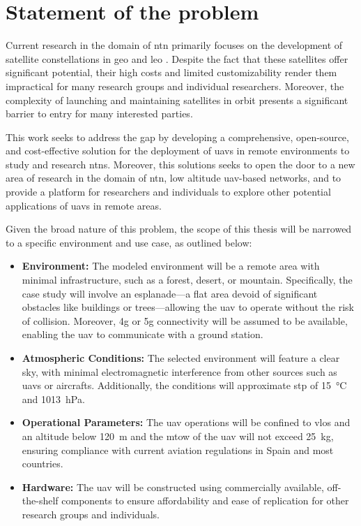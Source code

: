 
\chapter{Statement of the problem}\label{ch:statement_of_problem}

Current research in the domain of \gls{ntn} primarily focuses on the development of satellite constellations in \gls{geo} and \gls{leo} \autocite{non_terrestial_networks_trends}. Despite the fact that these satellites offer significant potential, their high costs and limited customizability render them impractical for many research groups and individual researchers. Moreover, the complexity of launching and maintaining satellites in orbit presents a significant barrier to entry for many interested parties.

This work seeks to address the gap by developing a comprehensive, open-source, and cost-effective solution for the deployment of \glspl{uav} in remote environments to study and research \glspl{ntn}. Moreover, this solutions seeks to open the door to a new area of research in the domain of \gls{ntn}, low altitude \gls{uav}-based networks, and to provide a platform for researchers and individuals to explore other potential applications of \glspl{uav} in remote areas.

Given the broad nature of this problem, the scope of this thesis will be narrowed to a specific environment and use case, as outlined below:

\begin{itemize}
  \item \textbf{Environment:} The modeled environment will be a remote area with minimal infrastructure, such as a forest, desert, or mountain. Specifically, the case study will involve an esplanade—a flat area devoid of significant obstacles like buildings or trees—allowing the \gls{uav} to operate without the risk of collision. Moreover, \gls{4g} or \gls{5g} connectivity will be assumed to be available, enabling the \gls{uav} to communicate with a ground station.

  \item \textbf{Atmospheric Conditions:} The selected environment will feature a clear sky, with minimal electromagnetic interference from other sources such as \glspl{uav} or aircrafts. Additionally, the conditions will approximate \gls{stp} of \SI{15}{\degreeCelsius} and \SI{1013}{\hecto\pascal}.

  \item \textbf{Operational Parameters:} The \gls{uav} operations will be confined to \gls{vlos} and an altitude below \SI{120}{\metre} and the \gls{mtow} of the \gls{uav} will not exceed \SI{25}{\kilogram}, ensuring compliance with current aviation regulations in Spain and most countries.

  \item \textbf{Hardware:} The \gls{uav} will be constructed using commercially available, off-the-shelf components to ensure affordability and ease of replication for other research groups and individuals.
\end{itemize}

